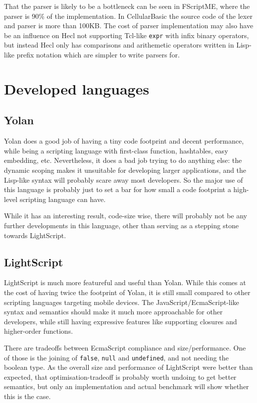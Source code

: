 \documentclass[11pt]{report}
\begin{document}
That the parser is likely to be a bottleneck can be seen in FScriptME, where the parser is 90\% of the implementation. In CellularBasic the source code of the lexer and parser is more than 100KB. 
The cost of parser implementation may also have be an influence on Hecl not supporting Tcl-like \verb|expr| with infix binary operators, but instead Hecl only has comparisons and arithemetic operators written in Lisp-like prefix notation which are simpler to write parsers for.

\section{Developed languages}
\subsection{Yolan}
Yolan does a good job of having a tiny code footprint and decent performance, while being a scripting language with first-class function, hashtables, easy embedding, etc. Nevertheless, it does a bad job trying to do anything else:
the dynamic scoping makes it unsuitable for developing larger applications, and the Lisp-like syntax will probably scare away most developers.
So the major use of this language is probably just to set a bar for how small a code footprint a high-level scripting language can have.

While it has an interesting result, code-size wise, there will probably not be any further developments in this language, other than serving as a stepping stone towards LightScript.

\subsection{LightScript}
LightScript is much more featureful and useful than Yolan. While this comes at the cost of having twice the footprint of Yolan, it is still small compared to other scripting languages targeting mobile devices. 
The JavaScript/EcmaScript-like syntax and semantics should make it much more approachable for other developers, while still having expressive features like supporting closures and higher-order functions.

There are tradeoffs between EcmaScript compliance and size/performance. 
One of those is the joining of \verb|false|, \verb|null| and \verb|undefined|, and not needing the boolean type.
As the overall size and performance of LightScript were better than expected,
that optimisation-tradeoff is probably worth undoing to get better semantics, 
but only an implementation and actual benchmark will show whether this is the case. 
\end{document}
